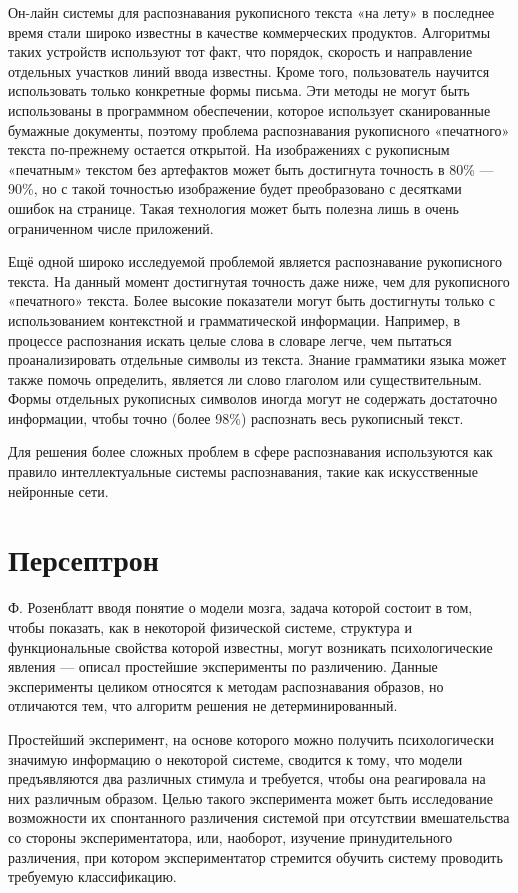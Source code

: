 Он-лайн системы для распознавания рукописного текста «на лету» в последнее время стали широко известны в качестве коммерческих продуктов. Алгоритмы таких устройств используют тот факт, что порядок, скорость и направление отдельных участков линий ввода известны. Кроме того, пользователь научится использовать только конкретные формы письма. Эти методы не могут быть использованы в программном обеспечении, которое использует сканированные бумажные документы, поэтому проблема распознавания рукописного «печатного» текста по-прежнему остается открытой. На изображениях с рукописным «печатным» текстом без артефактов может быть достигнута точность в 80\% — 90\%, но с такой точностью изображение будет преобразовано с десятками ошибок на странице. Такая технология может быть полезна лишь в очень ограниченном числе приложений.

Ещё одной широко исследуемой проблемой является распознавание рукописного текста. На данный момент достигнутая точность даже ниже, чем для рукописного «печатного» текста. Более высокие показатели могут быть достигнуты только с использованием контекстной и грамматической информации. Например, в процессе распознания искать целые слова в словаре легче, чем пытаться проанализировать отдельные символы из текста. Знание грамматики языка может также помочь определить, является ли слово глаголом или существительным. Формы отдельных рукописных символов иногда могут не содержать достаточно информации, чтобы точно (более 98\%) распознать весь рукописный текст.

Для решения более сложных проблем в сфере распознавания используются как правило интеллектуальные системы распознавания, такие как искусственные нейронные сети.

\section{Персептрон}
Ф. Розенблатт вводя понятие о модели мозга, задача которой состоит в том, чтобы показать, как в некоторой физической системе, структура и функциональные свойства которой известны, могут возникать психологические явления — описал простейшие эксперименты по различению. Данные эксперименты целиком относятся к методам распознавания образов, но отличаются тем, что алгоритм решения не детерминированный.

Простейший эксперимент, на основе которого можно получить психологически значимую информацию о некоторой системе, сводится к тому, что модели предъявляются два различных стимула и требуется, чтобы она реагировала на них различным образом. Целью такого эксперимента может быть исследование возможности их спонтанного различения системой при отсутствии вмешательства со стороны экспериментатора, или, наоборот, изучение принудительного различения, при котором экспериментатор стремится обучить систему проводить требуемую классификацию.


